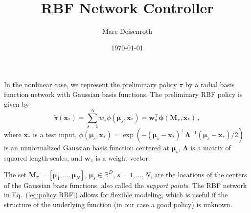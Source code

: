 \documentclass[a4paper, 11pt]{article}
\title{RBF Network Controller}
\date{\today}
\author{Marc Deisenroth}
\newcommand{\R}{\mathds{R}}
\renewcommand{\vec}{\boldsymbol}
\newcommand{\mat}{\boldsymbol}
\newcommand{\var}{\mathrm{var}}
\newcommand{\T}{^\top}
\newcommand{\inv}{^{-1}}
\begin{document}
\maketitle


In the nonlinear case, we represent the preliminary policy $\tilde\pi$
by a radial basis function network with Gaussian basis functions. The
preliminary RBF policy is given by
%
\begin{equation}\label{eq:policy RBF}
  \tilde\pi(\vec x_*) =\sum\limits_{s=1}^N w_s \phi(\vec\mu_s,\vec x_*) =
  \vec w_\pi\T \vec\phi(\mat M_\pi,\vec x_*)\,,
\end{equation}
%
where $\vec x_*$ is a test input, $\phi(\vec\mu_s,\vec x_*) =
\exp(-(\vec \mu_s-\vec x_*)\T\mat\Lambda\inv(\vec\mu_s-\vec x_*)/2)$ is
an unnormalized Gaussian basis function centered at $\vec \mu_s$,
$\mat\Lambda$ is a matrix of squared length-scales,  and
$\vec w_\pi$ is a weight vector.

The set $\mat M_\pi=[\vec \mu_1,\dotsc,\vec \mu_N]$, $\vec
\mu_s\in\R^D$, $s=1,\dotsc,N$, are the locations of the centers of the
Gaussian basis functions, also called the \emph{support points}. The
RBF network in Eq.~(\ref{eq:policy RBF}) allows for flexible modeling,
which is useful if the structure of the underlying function (in our
case a good policy) is unknown.


\end{document}
